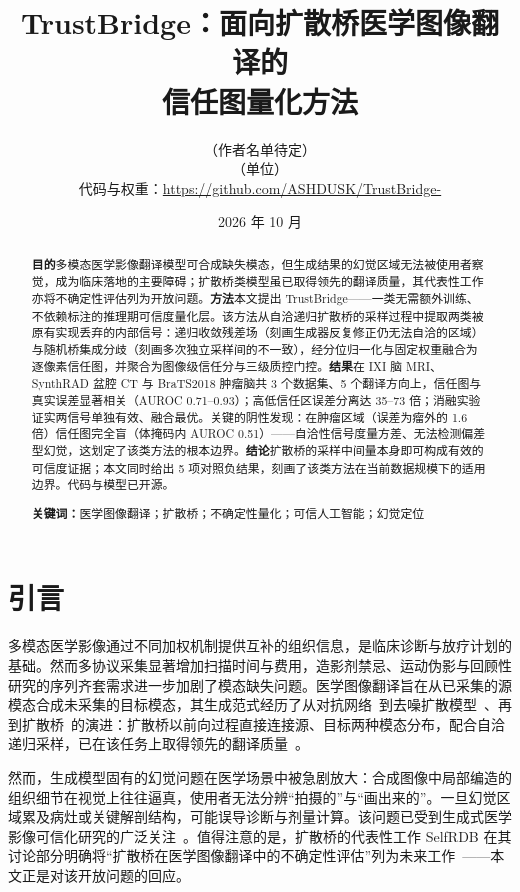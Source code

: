 \documentclass[11pt,a4paper]{ctexart}
\title{\textbf{TrustBridge：面向扩散桥医学图像翻译的\\信任图量化方法}}
\author{（作者名单待定）\\（单位）\\\small 代码与权重：\url{https://github.com/ASHDUSK/TrustBridge-}}
\date{2026 年 10 月}
\begin{document}
\maketitle

\begin{abstract}
\noindent\textbf{目的}\quad 多模态医学影像翻译模型可合成缺失模态，但生成结果的幻觉区域无法被使用者察觉，成为临床落地的主要障碍；扩散桥类模型虽已取得领先的翻译质量，其代表性工作亦将不确定性评估列为开放问题。\textbf{方法}\quad 本文提出 TrustBridge——一类无需额外训练、不依赖标注的推理期可信度量化层。该方法从自洽递归扩散桥的采样过程中提取两类被原有实现丢弃的内部信号：递归收敛残差场（刻画生成器反复修正仍无法自洽的区域）与随机桥集成分歧（刻画多次独立采样间的不一致），经分位归一化与固定权重融合为逐像素信任图，并聚合为图像级信任分与三级质控门控。\textbf{结果}\quad 在 IXI 脑 MRI、SynthRAD 盆腔 CT 与 BraTS2018 肿瘤脑共 3 个数据集、5 个翻译方向上，信任图与真实误差显著相关（AUROC 0.71--0.93）；高低信任区误差分离达 35--73 倍；消融实验证实两信号单独有效、融合最优。关键的阴性发现：在肿瘤区域（误差为瘤外的 1.6 倍）信任图完全盲（体掩码内 AUROC 0.51）——自洽性信号度量方差、无法检测偏差型幻觉，这划定了该类方法的根本边界。\textbf{结论}\quad 扩散桥的采样中间量本身即可构成有效的可信度证据；本文同时给出 5 项对照负结果，刻画了该类方法在当前数据规模下的适用边界。代码与模型已开源。

\vspace{0.5em}
\noindent\textbf{关键词：}医学图像翻译；扩散桥；不确定性量化；可信人工智能；幻觉定位
\end{abstract}

\section{引言}

多模态医学影像通过不同加权机制提供互补的组织信息，是临床诊断与放疗计划的基础。然而多协议采集显著增加扫描时间与费用，造影剂禁忌、运动伪影与回顾性研究的序列齐套需求进一步加剧了模态缺失问题。医学图像翻译旨在从已采集的源模态合成未采集的目标模态，其生成范式经历了从对抗网络~\cite{zhu2017cyclegan,isola2017pix2pix,dar2019cgan}到去噪扩散模型~\cite{ho2020ddpm,ozbey2023syndiff}、再到扩散桥~\cite{liu2023i2sb,chung2023directbridge,arslan2025selfrdb}的演进：扩散桥以前向过程直接连接源、目标两种模态分布，配合自洽递归采样，已在该任务上取得领先的翻译质量~\cite{arslan2025selfrdb}。

然而，生成模型固有的幻觉问题在医学场景中被急剧放大：合成图像中局部编造的组织细节在视觉上往往逼真，使用者无法分辨``拍摄的''与``画出来的''。一旦幻觉区域累及病灶或关键解剖结构，可能误导诊断与剂量计算。该问题已受到生成式医学影像可信化研究的广泛关注~\cite{jin2026trustworthy,fink2026airads}。值得注意的是，扩散桥的代表性工作 SelfRDB 在其讨论部分明确将``扩散桥在医学图像翻译中的不确定性评估''列为未来工作~\cite{arslan2025selfrdb}——本文正是对该开放问题的回应。
\end{document}
